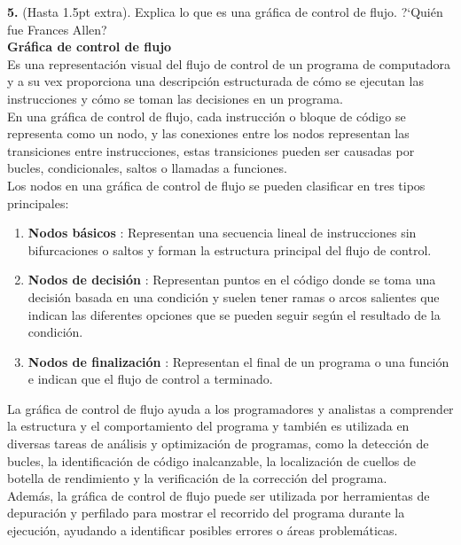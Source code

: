 \textbf{5.} (Hasta 1.5pt extra). Explica lo que es una gr\'afica de control de flujo.
?`Qui\'en fue Frances Allen?\\

\textbf{Gráfica de control de flujo}\\

Es una representación visual del flujo de control de un programa de computadora y a su vex proporciona una descripción estructurada de cómo se ejecutan las instrucciones y cómo se toman las decisiones en un programa.\\

En una gráfica de control de flujo, cada instrucción o bloque de código se representa como un nodo, y las conexiones entre los nodos representan las transiciones entre instrucciones, estas transiciones pueden ser causadas por bucles, condicionales, saltos o llamadas a funciones.\\

Los nodos en una gráfica de control de flujo se pueden clasificar en tres tipos principales:

\begin{enumerate}
    \item \textbf{Nodos básicos} : Representan una secuencia lineal de instrucciones sin bifurcaciones o saltos y forman la estructura principal del flujo de control.
    \item \textbf{Nodos de decisión} : Representan puntos en el código donde se toma una decisión basada en una condición y suelen tener ramas o arcos salientes que indican las diferentes opciones que se pueden seguir según el resultado de la condición.
    \item \textbf{Nodos de finalización} : Representan el final de un programa o una función e indican que el flujo de control a terminado.
\end{enumerate}

La gráfica de control de flujo ayuda a los programadores y analistas a comprender la estructura y el comportamiento del programa y también es utilizada en diversas tareas de análisis y optimización de programas, como la detección de bucles, la identificación de código inalcanzable, la localización de cuellos de botella de rendimiento y la verificación de la corrección del programa.\\

Además, la gráfica de control de flujo puede ser utilizada por herramientas de depuración y perfilado para mostrar el recorrido del programa durante la ejecución, ayudando a identificar posibles errores o áreas problemáticas.\\

